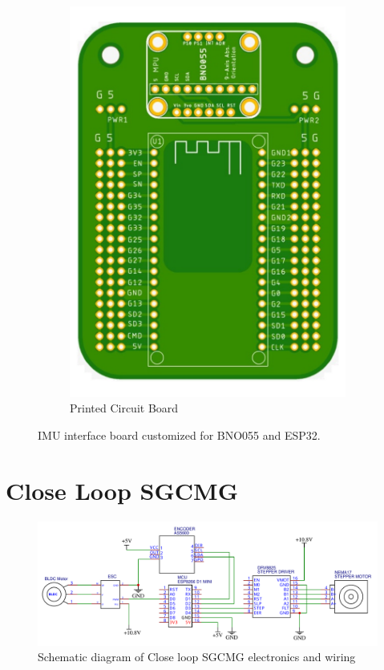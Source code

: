\begin{figure}[ht]
\begin{subfigure}[b]{0.4\textwidth}
         \includegraphics[width=\textwidth]{figures/Electronics/intefecePCB.pdf}
         \caption{Printed Circuit Board}
         \label{fig:intefecePCB}
     \end{subfigure}
    \caption{IMU interface board customized for BNO055 and ESP32. }
    \label{fig:intefeceIMU}
\end{figure}


\section{Close Loop SGCMG}
\begin{figure}[ht]
    \centering
    \includegraphics[width=\textwidth]{figures/Assembly/sgcmg_wiring.pdf}
    \caption{Schematic diagram of Close loop SGCMG electronics and wiring}
    \label{fig:sch_sgcmg_wiring}
\end{figure}

